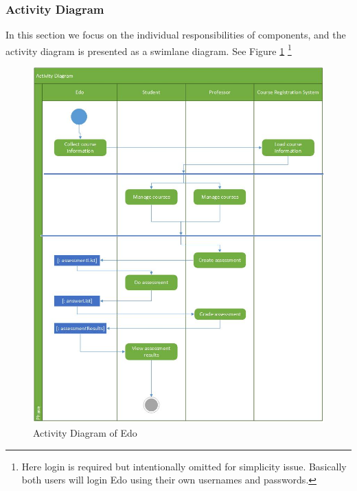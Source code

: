 \documentclass[paper=a4, fontsize=11pt]{scrartcl}
\numberwithin{equation}{section}		%
\numberwithin{figure}{section}			%
\numberwithin{table}{section}				%
\begin{document}
\subsubsection{Activity Diagram}
In this section we focus on the individual responsibilities of components, and the activity diagram is presented as a swimlane diagram. See Figure \ref{activity} \footnote{Here login is required but intentionally omitted for simplicity issue. Basically both users will login Edo using their own usernames and passwords.}
\begin{figure}[!ht]
	\begin{center}
		\includegraphics[width=\textwidth,height=\textheight,keepaspectratio]{activity_diagram}
	\end{center}
	\caption{Activity Diagram of Edo}
	\label{activity}
\end{figure}
\end{document}
